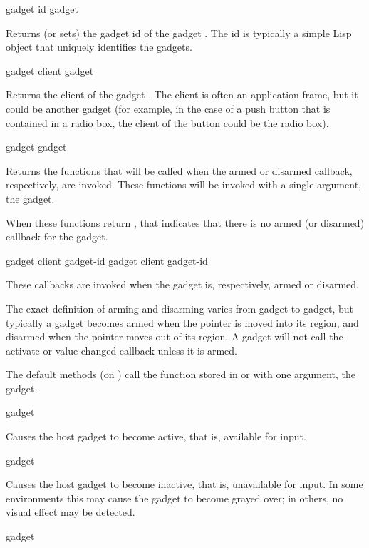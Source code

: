  {gadget}
 {id gadget}

Returns (or sets) the gadget id of the gadget .  The id is typically
a simple Lisp object that uniquely identifies the gadgets.

 {gadget}
 {client gadget}

Returns the client of the gadget .  The client is often an
application frame, but it could be another gadget (for example, in the case of a
push button that is contained in a radio box, the client of the button could be
the radio box).

 {gadget}
 {gadget}

Returns the functions that will be called when the armed or disarmed callback,
respectively, are invoked.  These functions will be invoked with a single
argument, the gadget.

When these functions return , that indicates that there is no armed (or
disarmed) callback for the gadget.

 {gadget client gadget-id}
 {gadget client gadget-id}

These callbacks are invoked when the gadget  is, respectively, armed
or disarmed.

The exact definition of arming and disarming varies from gadget to gadget, but
typically a gadget becomes armed when the pointer is moved into its region, and
disarmed when the pointer moves out of its region.  A gadget will not call the
activate or value-changed callback unless it is armed.

The default methods (on ) call the function stored in
 or  with one argument,
the gadget.

 {gadget}

Causes the host gadget to become active, that is, available for input.

 {gadget}

Causes the host gadget to become inactive, that is, unavailable for input.  In
some environments this may cause the gadget to become grayed over; in others, no
visual effect may be detected.

 {gadget}

